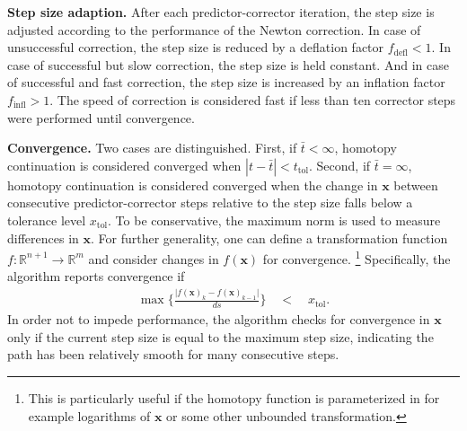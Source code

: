 \documentclass[11pt,fleqn]{article}
\newcommand{\R}{\mathbb{R}}
\begin{document}
\textbf{Step size adaption.} %
After each predictor-corrector iteration, the step size is adjusted according to the performance of the Newton correction. In case of unsuccessful correction, the step size is reduced by a deflation factor $f_{\text{defl}} < 1$. In case of successful but slow correction, the step size is held constant. And in case of successful and fast correction, the step size is increased by an inflation factor $f_{\text{infl}} > 1$. The speed of correction is considered fast if less than ten corrector steps were performed until convergence.


\textbf{Convergence.} %
Two cases are distinguished. First, if $\bar{t} < \infty$, homotopy continuation is considered converged when $|t-\bar{t}| < t_{\text{tol}}$. Second, if $\bar{t} = \infty$, homotopy continuation is considered converged when the change in $\bm{x}$ between consecutive predictor-corrector steps relative to the step size falls below a tolerance level $x_{\text{tol}}$. To be conservative, the maximum norm is used to measure differences in $\bm{x}$. For further generality, one can define a transformation function $f: \R^{n+1} \rightarrow \R^m$ and consider changes in $f(\bm{x})$ for convergence.%
\footnote{%
This is particularly useful if the homotopy function is parameterized in for example logarithms of $\bm{x}$ or some other unbounded transformation.} %
Specifically, the algorithm reports convergence if 
\begin{align*}
	\max \Biggl\{ \frac{ \bigl| f(\bm{x})_k - f(\bm{x})_{k-1} \bigr| }{ ds } \Biggr\} \quad<\quad x_{\text{tol}}.
\end{align*}
In order not to impede performance, the algorithm checks for convergence in $\bm{x}$ only if the current step size is equal to the maximum step size, indicating the path has been relatively smooth for many consecutive steps. 








\end{document}
